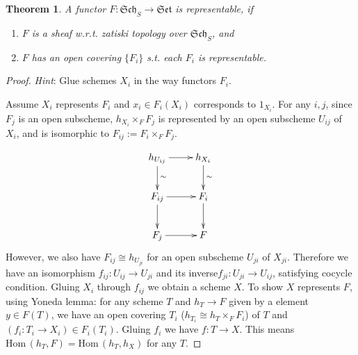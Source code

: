 \documentclass{article}
\newtheorem{thm}[defn]{Theorem}
\newcommand{\Hom}{\mathrm{Hom}\,}
\begin{document}
\begin{thm}
	A functor $ F:\mathfrak{Sch}_S\to \mathfrak{Set}  $ is representable, if
	\begin{enumerate}
		\item $ F $ is a sheaf w.r.t. zatiski topology over $ \mathfrak{Sch}_S $, and
		\item $ F $ has an open covering $ \{F_i\} $ s.t. each $ F_i $ is representable.
	\end{enumerate} 
\end{thm}
\begin{proof}
	\emph{Hint}: Glue schemes $ X_i $ in the way functors $ F_i $.
	
	Assume $ X_i $ represents $ F_i $ and $ x_i\in F_i(X_i) $ corresponds to $ 1_{X_i} $. For any $ i,j $, since $ F_j $ is an open subscheme, $ h_{X_i}\times_FF_j $ is represented by an open subscheme $ U_{ij} $ of $ X_i $, and is isomorphic to $ F_{ij}:=F_i\times _FF_j $.
	
	$$\xymatrix{  %
		h_{U_{ij}}\ar[r]\ar[d]^\sim&h_{X_i}\ar[d]^\sim\\
		F_{ij}\ar[r]\ar[d]&F_i\ar[d]\\
		F_j\ar[r]&F
	}$$
	However, we also have $ F_{ij}\cong h_{U_{ji}} $ for an open subscheme $ U_{ji} $ of $ X_{ji} $. Therefore we have an isomorphism $ f_{ij}:U_{ij}\to U_{ji} $ and its inverse$ f_{ji}:U_{ji}\to U_{ij} $, satisfying cocycle condition. Gluing $ X_i $ through $ f_{ij} $ we obtain a scheme $ X $. To show $ X $ represents $ F $, using Yoneda lemma: for any scheme $ T $ and $ h_T\to F $ given by a element $ y\in F(T) $, we have an open covering $ T_i $ ($ h_{T_i}\cong h_T\times_FF_i $) of $ T $ and $ (f_i: T_i\to X_i)\in F_i(T_i) $. Gluing $ f_i $ we have $ f:T\to X $. This means $ \Hom (h_T,F)=\Hom(h_T,h_X) $ for any $ T $.
\end{proof}
\end{document}
